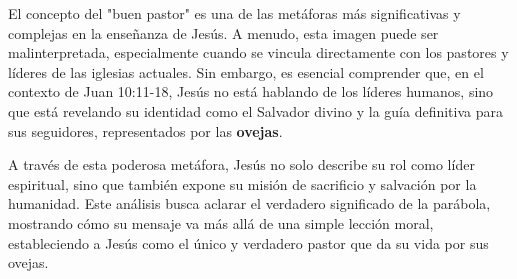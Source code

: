 El concepto del "buen pastor" es una de las metáforas más significativas y complejas en la enseñanza de Jesús. A menudo, esta imagen puede ser malinterpretada, especialmente cuando se vincula directamente con los pastores y líderes de las iglesias actuales. Sin embargo, es esencial comprender que, en el contexto de Juan 10:11-18, Jesús no está hablando de los líderes humanos, sino que está revelando su identidad como el Salvador divino y la guía definitiva para sus seguidores, representados por las \textbf{ovejas}.

A través de esta poderosa metáfora, Jesús no solo describe su rol como líder espiritual, sino que también expone su misión de sacrificio y salvación por la humanidad. Este análisis busca aclarar el verdadero significado de la parábola, mostrando cómo su mensaje va más allá de una simple lección moral, estableciendo a Jesús como el único y verdadero pastor que da su vida por sus ovejas.

